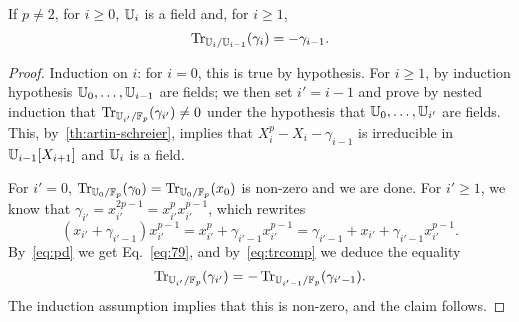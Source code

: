 \begin{lemma}
  \label{coro:trace}
  If $p\ne2$, for $i \ge 0$, $\mathbb{U}_i$ is a field and, for $i\ge1$,
  \begin{equation}
    \label{eq:79}
    \operatorname{Tr}_{\mathbb{U}_i/\mathbb{U}_{i-1}}(\gamma_i) = -\gamma_{i-1}
    \text{.}    
  \end{equation}
\end{lemma}
\begin{proof} Induction on $i$: for $i=0$, this is true by
  hypothesis. For $i \ge 1$, by induction hypothesis
  $\mathbb{U}_0,\ldots,\mathbb{U}_{i-1}$ are fields; we then set $i'=i-1$ and prove by
  nested induction that $\operatorname{Tr}_{\mathbb{U}_{i'}/\mathbb{F}_p}(\gamma_{i'})\ne 0$ under
  the hypothesis that $\mathbb{U}_0,\ldots,\mathbb{U}_{i'}$ are fields. This,
  by~\ref{th:artin-schreier}, implies that
  $X_i^p-X_i-\gamma_{i-1}$ is irreducible in $\mathbb{U}_{i-1}[X_{i+1}]$ and
  $\mathbb{U}_i$ is a field.

  For $i'=0$, $\operatorname{Tr}_{\mathbb{U}_0/\mathbb{F}_p}(\gamma_0)=\operatorname{Tr}_{\mathbb{U}_0/\mathbb{F}_p}(x_0)$ is
  non-zero and we are done.  For $i' \ge 1$, we know that
  $\gamma_{i'}=x_{i'}^{2p-1}=x_{i'}^px_{i'}^{p-1}$, which rewrites
  \begin{equation}
    (x_{i'}+\gamma_{i'-1})x_{i'}^{p-1} = x_{i'}^p +\gamma_{i'-1} x_{i'}^{p-1}
    = \gamma_{i'-1} + x_{i'} +\gamma_{i'-1} x_{i'}^{p-1}.
  \end{equation}
  By~\ref{eq:pd} we get Eq.~\eqref{eq:79}, and by~\ref{eq:trcomp} we
  deduce the equality
  \begin{equation}
    \label{eq:64}
    \operatorname{Tr}_{\mathbb{U}_{i'}/\mathbb{F}_p}(\gamma_{i'})=-\operatorname{Tr}_{\mathbb{U}_{i'-1}/\mathbb{F}_p}(\gamma_{i'-1})\text{.}    
  \end{equation}
  The induction assumption implies that this is non-zero, and the
  claim follows.
\end{proof}

